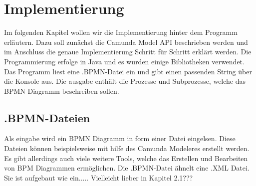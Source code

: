 
\chapter{Implementierung} %

\label{Chapter4} %

Im folgenden Kapitel wollen wir die Implementierung hinter dem Programm erläutern. Dazu soll zunächst die Camunda Model API beschrieben werden und im Anschluss die genaue Implementierung Schritt für Schritt erklärt werden.
Die Programmierung erfolge in Java und es wurden einige Bibliotheken verwendet. Das Programm liest eine .BPMN-Datei ein und gibt einen passenden String über die Konsole aus. Die ausgabe enthält die Prozesse und Subprozesse, welche das BPMN Diagramm beschreiben sollen.
\section {.BPMN-Dateien}
Als eingabe wird ein BPMN Diagramm in form einer Datei eingelsen. Diese Dateien können beispielsweise mit hilfe des Camunda Modeleres erstellt werden. Es gibt allerdings auch viele weitere Tools, welche das Erstellen und Bearbeiten von BPM Diagrammen ermöglichen. Die .BPMN-Datei ähnelt eine .XML Datei. Sie ist aufgebaut wie ein..... Vielleicht lieber in Kapitel 2.1???
